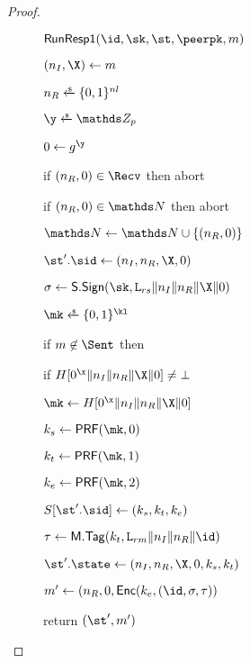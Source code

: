 \begin{proof}
\begin{collectinmacro}{\SIGMIProofPRF}{}{} %
\begin{figure}[t]
    \begin{minipage}[t]{0.49\textwidth}

      \begin{oracle}{$\RunRespI(\id,\sk,\st,\peerpk,m)$}
          \item $(\nonce_I,\X) \gets m$
          \item $\nonce_R \sample \bits^{\nl}$
          \item $\y \sample \ZZ_p$
          \item $\Y \gets g^{\y}$
          \item if $(\nonce_R, \Y) \in \Recv$ then abort
          \item if $(\nonce_R, \Y) \in \N$ then abort
		  \item $\N \gets \N \cup \{(\nonce_R,\Y)\}$
          \item $\st'.\sid \gets (\nonce_I, \nonce_R,\X,\Y)$
          \item $\sigma \gets \SIGScheme.\SIGSign(\sk,\labelrs\|\nonce_I\|\nonce_R\|\X\|\Y)$
          \item $\mk\sample \bits^{\kl}$
          \item if $m \not\in \Sent$ then
          \item \hindent if $H[\Y^{\x}\|\nonce_I\|\nonce_R\|\X\|\Y]\neq \bot$
          \item \hindent \hindent$\mk \gets H[\Y^{\x}\|\nonce_I\|\nonce_R\|\X\|\Y]$
          \item $\ks \gets \PRF(\mk,0)$
          \item $\kt \gets \PRF(\mk,1)$
          \item $\ke \gets \PRF(\mk,2)$
          \item {}
          \item \hindent {}
          \item \hindent {}
          \item \hindent {}
	      \item \hindent $\S[\st'.\sid] \gets (\ks,\kt,\ke)$
          \item $\tau \gets \MACScheme.\MACTag(\kt, \labelrm\|\nonce_I\|\nonce_R\|\id)$
          \item $\st'.\state \gets (\nonce_I,\nonce_R,\X,\Y,\ks,\kt)$
          \item $m' \gets (\nonce_R, \Y, \ENCEnc(\ke,(\id, \sigma, \tau))$
          \item return $(\st', m')$
      \end{oracle}
    \end{minipage}
    \begin{minipage}[t]{0.49\textwidth}



\end{minipage}
\end{figure}
\end{collectinmacro}
\end{proof}

